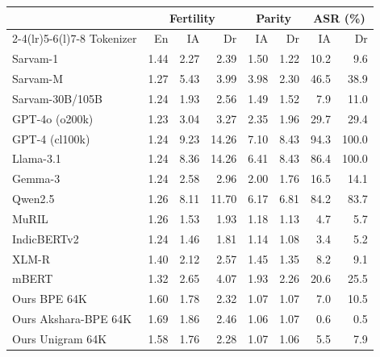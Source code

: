 \begin{tabular}{@{}lrrrrrrr@{}}
\toprule
 & \multicolumn{3}{c}{Fertility} & \multicolumn{2}{c}{Parity} & \multicolumn{2}{c}{ASR (\%)} \\
\cmidrule(lr){2-4}\cmidrule(lr){5-6}\cmidrule(l){7-8}
Tokenizer & En & IA & Dr & IA & Dr & IA & Dr \\
\midrule
Sarvam-1 & 1.44 & 2.27 & 2.39 & 1.50 & 1.22 & 10.2 & 9.6 \\
Sarvam-M & 1.27 & 5.43 & 3.99 & 3.98 & 2.30 & 46.5 & 38.9 \\
Sarvam-30B/105B & 1.24 & 1.93 & 2.56 & 1.49 & 1.52 & 7.9 & 11.0 \\
GPT-4o (o200k) & 1.23 & 3.04 & 3.27 & 2.35 & 1.96 & 29.7 & 29.4 \\
GPT-4 (cl100k) & 1.24 & 9.23 & 14.26 & 7.10 & 8.43 & 94.3 & 100.0 \\
Llama-3.1 & 1.24 & 8.36 & 14.26 & 6.41 & 8.43 & 86.4 & 100.0 \\
Gemma-3 & 1.24 & 2.58 & 2.96 & 2.00 & 1.76 & 16.5 & 14.1 \\
Qwen2.5 & 1.26 & 8.11 & 11.70 & 6.17 & 6.81 & 84.2 & 83.7 \\
MuRIL & 1.26 & 1.53 & 1.93 & 1.18 & 1.13 & 4.7 & 5.7 \\
IndicBERTv2 & 1.24 & 1.46 & 1.81 & 1.14 & 1.08 & 3.4 & 5.2 \\
XLM-R & 1.40 & 2.12 & 2.57 & 1.45 & 1.35 & 8.2 & 9.1 \\
mBERT & 1.32 & 2.65 & 4.07 & 1.93 & 2.26 & 20.6 & 25.5 \\
\midrule
Ours BPE 64K & 1.60 & 1.78 & 2.32 & 1.07 & 1.07 & 7.0 & 10.5 \\
Ours Akshara-BPE 64K & 1.69 & 1.86 & 2.46 & 1.06 & 1.07 & 0.6 & 0.5 \\
Ours Unigram 64K & 1.58 & 1.76 & 2.28 & 1.07 & 1.06 & 5.5 & 7.9 \\
\bottomrule
\end{tabular}
